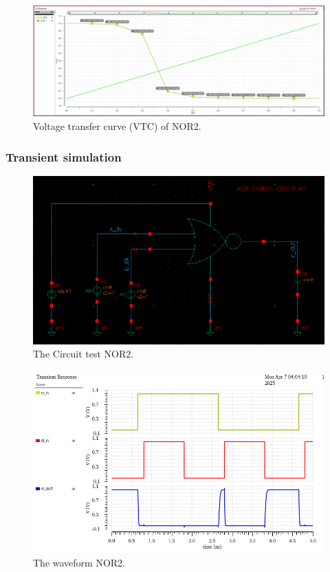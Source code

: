 \begin{figure}[H]
	\centering
	\includegraphics[width=.6\linewidth]{section/EX1/NOR/EX1_NOR2_DCanalysis_vtc.png}
	\caption{Voltage transfer curve (VTC) of NOR2.}
	\label{f_EX1_NOR2_DCanalysis_vtc}
\end{figure}

\subsubsection{Transient simulation}

\begin{figure}[H]
	\centering
	\includegraphics[width=.6\linewidth]{section/EX1/NOR/EX1_NOR2_Trans_schematic.png}
	\caption{The Circuit test NOR2.}
\end{figure}

\begin{figure}[H]
	\centering
	\includegraphics[width=.6\linewidth]{section/EX1/NOR/EX1_NOR2_waveform.png}
	\caption{The waveform NOR2.}
	\label{f_EX1_NOR2_waveform}
\end{figure}

